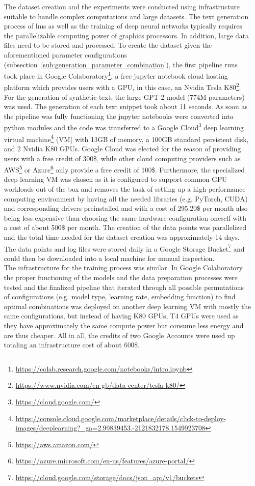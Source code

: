 The dataset creation and the experiments were conducted using infrastructure suitable to handle complex computations and large datasets. The text generation process of \gls{lm}s as well as the training of deep neural networks typically requires the parallelizable computing power of graphics processors. In addition, large data files need to be stored and processed. To create the dataset given the aforementioned parameter configurations (subsection~\ref{sub:generation_parameter_combination}), the first pipeline runs took place in Google Colaboratory\footnote{\url{https://colab.research.google.com/notebooks/intro.ipynb}}, a free jupyter notebook cloud hosting platform which provides users with a GPU, in this case, an Nvidia Tesla K80\footnote{\url{https://www.nvidia.com/en-gb/data-center/tesla-k80/}}. For the generation of synthetic text, the large GPT-2 model (774M parameters) was used. The generation of each text snippet took about 11 seconds. As soon as the pipeline was fully functioning the jupyter notebooks were converted into python modules and the code was transferred to a Google Cloud\footnote{\url{https://cloud.google.com/}} deep learning virtual machine\footnote{\url{https://console.cloud.google.com/marketplace/details/click-to-deploy-images/deeplearning?_ga=2.99839453.-2121832178.1549923708}} (VM) with 13GB of memory, a 100GB standard persistent disk, and 2 Nvidia K80 GPUs. Google Cloud was elected for the reason of providing users with a free credit of 300\$, while other cloud computing providers such as AWS\footnote{\url{https://aws.amazon.com/}} or Azure\footnote{\url{https://azure.microsoft.com/en-us/features/azure-portal/}} only provide a free credit of 100\$. Furthermore, the specialized deep learning VM was chosen as it is configured to support common GPU workloads out of the box and removes the task of setting up a high-performance computing environment by having all the needed libraries (e.g. PyTorch, CUDA) and corresponding drivers preinstalled and with a cost of 295.20\$ per month also being less expensive than choosing the same hardware configuration oneself with a cost of about 500\$ per month. The creation of the data points was parallelized and the total time needed for the dataset creation was approximately 14 days. The data points and log files were stored daily in a Google Storage Bucket\footnote{\url{https://cloud.google.com/storage/docs/json_api/v1/buckets}} and could then be downloaded into a local machine for manual inspection. \\
The infrastructure for the training process was similar. In Google Colaboratory the proper functioning of the models and the data preparation processes were tested and the finalized pipeline that iterated through all possible permutations of configurations (e.g. model type, learning rate, embedding function) to find optimal combinations was deployed on another deep learning VM with mostly the same configurations, but instead of having K80 GPUs, T4 GPUs were used as they have approximately the same compute power but consume less energy and are thus cheaper. All in all, the credits of two Google Accounts were used up totaling an infrastructure cost of about 600\$.

